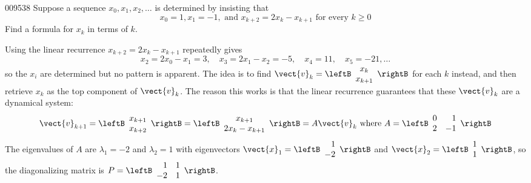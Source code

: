\begin{example}{}{009538}
Suppose a sequence $x_{0}, x_{1}, x_{2}, \dots$  is determined by insisting that
\begin{equation*}
x_0  = 1, x_1 = -1, \mbox{ and } x_{k+2} = 2x_k - x_{k+1} \mbox{ for every } k\geq 0 
\end{equation*}
Find a formula for $x_{k}$ in terms of $k$.

\begin{solution}
  Using the linear recurrence $x_{k+2} = 2x_{k} - x_{k+1}$ repeatedly gives
\begin{equation*}
x_2  = 2 x_0 - x_1 = 3, \quad x_3 = 2x_1 - x_2 = -5, \quad x_4 = 11, \quad x_5 = -21, \dots 
\end{equation*}
so the $x_{i}$ are determined but no pattern is apparent. The idea is to find $ \vect{v}_k = \leftB \begin{array}{c}
x_k \\
x_{k+1}
\end{array} \rightB$
 for each $k$ instead, and then retrieve $x_{k}$ as the top component of $\vect{v}_{k}$. The reason this works is that the linear recurrence guarantees that these $\vect{v}_{k}$ are a dynamical system:
\begin{equation*}
\vect{v}_{k+1} = \leftB \begin{array}{c}
x_{k+1} \\
x_{k+2}
\end{array}\rightB = \leftB \begin{array}{c}
x_{k+1} \\
2x_k - x_{k+1}
\end{array} \rightB 
= A \vect{v}_k
\mbox{ where } A = \leftB \begin{array}{rr}
0 & 1  \\
2 & -1 
\end{array} \rightB 
\end{equation*}
The eigenvalues of $A$ are $\lambda_{1} = -2$ and $\lambda_{2} = 1$ with eigenvectors $ \vect{x}_1 = \leftB \begin{array}{r}
1 \\
-2
\end{array}\rightB$
 and  $ \vect{x}_2 = \leftB \begin{array}{r}
1 \\
1
\end{array}\rightB$,
 so the diagonalizing matrix is $P = \leftB \begin{array}{rr}
1 & 1 \\
-2 & 1 
\end{array} \rightB$.


\end{solution}
\end{example}
